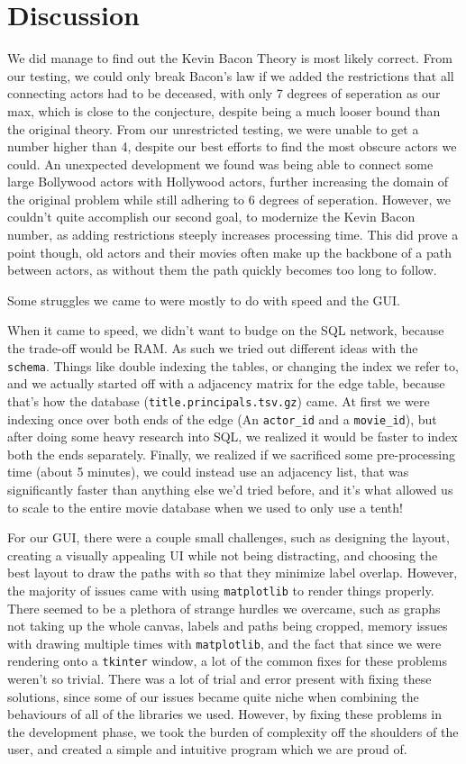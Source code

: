 \documentclass{article}
\begin{document}
\section{Discussion}
We did manage to find out the Kevin Bacon Theory is most likely correct. From our testing, we could only break Bacon's law if we added the restrictions that all connecting actors had to be deceased, with only 7 degrees of seperation as our max, which is close to the conjecture, despite being a much looser bound than the original theory. From our unrestricted testing, we were unable to get a number higher than 4, despite our best efforts to find the most obscure actors we could. An unexpected development we found was being able to connect some large Bollywood actors with Hollywood actors, further increasing the domain of the original problem while still adhering to 6 degrees of seperation. However, we couldn't quite accomplish our second goal, to modernize the Kevin Bacon number, as adding restrictions steeply increases processing time. This did prove a point though, old actors and their movies often make up the backbone of a path between actors, as without them the path quickly becomes too long to follow.

Some struggles we came to were mostly to do with speed and the GUI.

When it came to speed, we didn't want to budge on the SQL network, because the trade-off would be RAM. As such we tried out different ideas with the \verb!schema!. Things like double indexing the tables, or changing the index we refer to, and we actually started off with a adjacency matrix for the edge table, because that's how the database (\verb!title.principals.tsv.gz!) came. At first we were indexing once over both ends of the edge (An \verb!actor_id! and a \verb!movie_id!), but after doing some heavy research into SQL, we realized it would be faster to index both the ends separately. Finally, we realized if we sacrificed some pre-processing time (about 5 minutes), we could instead use an adjacency list, that was significantly faster than anything else we'd tried before, and it's what allowed us to scale to the entire movie database when we used to only use a tenth!

For our GUI, there were a couple small challenges, such as designing the layout, creating a visually appealing UI while not being distracting, and choosing the best layout to draw the paths with so that they minimize label overlap. However, the majority of issues came with using \verb!matplotlib! to render things properly. There seemed to be a plethora of strange hurdles we overcame, such as graphs not taking up the whole canvas, labels and paths being cropped, memory issues with drawing multiple times with \verb!matplotlib!, and the fact that since we were rendering onto a \verb!tkinter! window, a lot of the common fixes for these problems weren't so trivial. There was a lot of trial and error present with fixing these solutions, since some of our issues became quite niche when combining the behaviours of all of the libraries we used. However, by fixing these problems in the development phase, we took the burden of complexity off the shoulders of the user, and created a simple and intuitive program which we are proud of.
\end{document}
